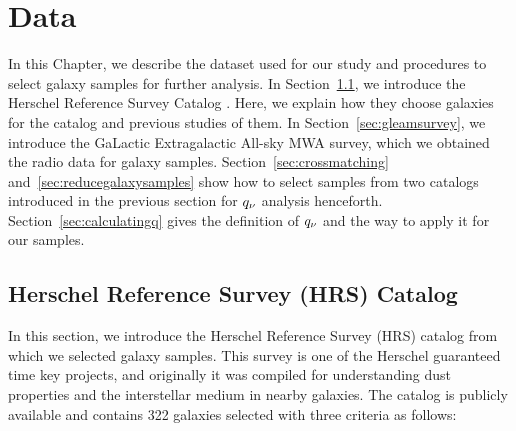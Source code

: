\chapter{Data}\label{chap:data}
\begin{chapabstract}

In this Chapter, we describe the dataset used for our study and procedures to select galaxy samples for further analysis.
In Section~\ref{sec:HerschelReferenceSurvey}, we introduce the Herschel Reference Survey Catalog \citep{Boselli2010}.
Here, we explain how they choose galaxies for the catalog and previous studies of them.
In Section~\ref{sec:gleamsurvey}, we introduce the GaLactic Extragalactic All-sky MWA survey, which we obtained the radio data for galaxy samples.
Section~\ref{sec:crossmatching} and~\ref{sec:reducegalaxysamples} show how to select samples from two catalogs introduced in the previous section for $q_{\nu}$ analysis henceforth.
Section~\ref{sec:calculatingq} gives the definition of $q_{\nu}$ and the way to apply it for our samples.

\end{chapabstract}

\section{Herschel Reference Survey (HRS) Catalog}\label{sec:HerschelReferenceSurvey}
In this section, we introduce the Herschel Reference Survey (HRS) catalog \citep{Boselli2010} from which we selected galaxy samples.
This survey is one of the Herschel guaranteed time key projects, and originally it was compiled for understanding dust properties and the interstellar medium in nearby galaxies.
The catalog is publicly available and contains 322 galaxies selected with three criteria as follows:

